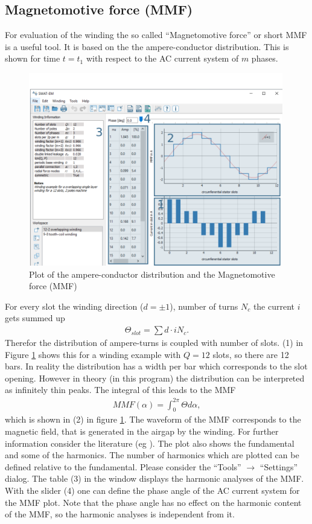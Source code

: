 \documentclass[]{scrreprt}
\begin{document}
\subsection{Magnetomotive force (MMF)} \label{sec:MMF}
For evaluation of the winding the so called "`Magnetomotive force"' or short MMF is a useful tool. It is
based on the the ampere-conductor distribution. This is shown for time $t=t_1$ with respect to the 
AC current system of $m$ phases.
%
\begin{figure}[htpb]
    \centering
    \includegraphics[width=0.99\textwidth,angle=0]{fig/mainwindow_MMF}
    \caption{Plot of the ampere-conductor distribution and the Magnetomotive force (MMF) }
    \label{fig:mainwindow_MMF}
\end{figure}
%
For every slot the winding direction ($d=\pm1$), number of turns $N_c$ the current $i$ gets summed up 
\begin{align}
\Theta_{slot} = \sum{d \cdot i N_c}.
\end{align} 
%
Therefor the distribution of ampere-turns is coupled with number of slots. (1) in Figure \ref{fig:mainwindow_MMF}
shows this for a winding example with $Q = 12$ slots, so there are 12 bars. In reality the distribution has
a width per bar which corresponds to the slot opening. However in theory (in this program) the distribution
can be interpreted as infinitely thin peaks. The integral of this leads to the MMF
\begin{align}
MMF(\alpha) = \int_0^{2\pi}{ \Theta d\alpha},
\end{align} 
%
which is shown in (2) in figure \ref{fig:mainwindow_MMF}.
The waveform of the MMF corresponds to the magnetic field, that is generated in the airgap by the winding.
For further information consider the literature (eg \cite{hendershot2010design}).
The plot also shows the fundamental and some of the harmonics. The number of harmonics which are plotted
can be defined relative to the fundamental. Please consider the "`Tools"' $\rightarrow$ "`Settings"' dialog.
The table (3) in the window displays the harmonic analyses of the MMF. With the slider (4) one can define
the phase angle of the AC current system for the MMF plot. Note that the phase angle has no effect on
the harmonic content of the MMF, so the harmonic analyses is independent from it.
%
%
%
\end{document}

